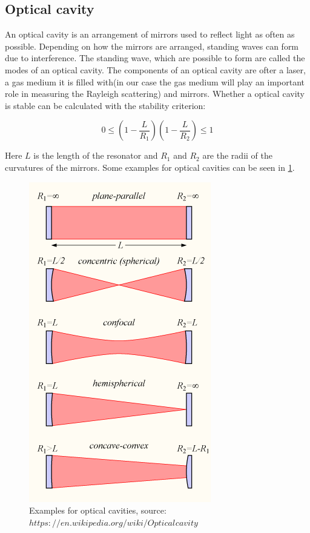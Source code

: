 \documentclass[10pt,a4paper]{article}
\begin{document}
\subsection{Optical cavity}

An optical cavity is an arrangement of mirrors used to reflect light as often as possible. Depending on how the mirrors are arranged, standing waves can form due to interference. The standing wave, which are possible to form are called the modes of an optical cavity. The components of an optical cavity are ofter a laser, a gas medium it is filled with(in our case the gas medium will play an important role in measuring the Rayleigh scattering) and mirrors. Whether a optical cavity is stable can be calculated with the stability criterion:

\begin{equation}
0 \leq (1 -  \frac{L}{R_1})(1- \frac{L}{R_2}) \leq 1
\end{equation}

Here $L$ is the length of the resonator and $R_1$ and $R_2$ are the radii of the curvatures of the mirrors. Some examples for optical cavities can be seen in \ref{optical_cavities}.

\begin{figure}[h]
	\includegraphics[scale = 0.5]{Optical-cavity1.png}
	\centering
	\caption{Examples for optical cavities, source: \href{https://en.wikipedia.org/wiki/Optical_cavity}{$https://en.wikipedia.org/wiki/Optical_{}cavity$}}
	\label{optical_cavities}
\end{figure}
\end{document}

